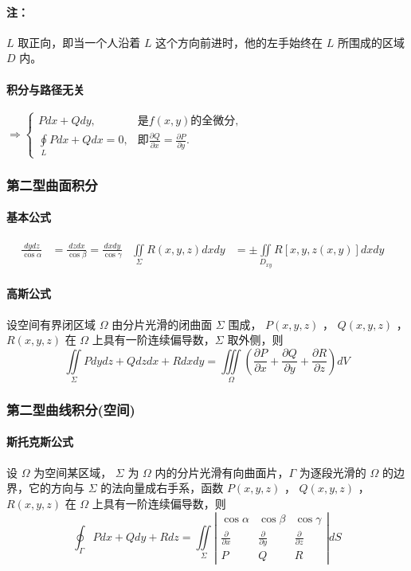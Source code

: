 ﻿\documentclass[a4paper,12pt,UTF8]{ctexart}
\begin{document}
    \paragraph{注：} \(L\) 取正向，即当一个人沿着 \(L\) 这个方向前进时，他的左手始终在 \(L\) 所围成的区域 \(D\) 内。
    
    \paragraph{积分与路径无关}
    \(\Rightarrow \begin{cases}
        Pdx+Qdy,& \text{是} f(x, y) \text{的全微分},\\
        \oint \limits_{L} Pdx+Qdx = 0,& \text{即} \frac{\partial Q}{\partial x} = \frac{\partial P}{\partial y}.
    \end{cases}\)

    \subsubsection{第二型曲面积分}
    \paragraph{基本公式}
    \begin{align*}
        \frac{dydz}{\cos \alpha}&=\frac{dzdx}{\cos \beta}=\frac{dxdy}{\cos \gamma}& \iint \limits_{\Sigma} R(x,y,z)dxdy&=\pm \iint \limits_{D_{xy}} R[x,y,z(x,y)]dxdy&
    \end{align*}

    \paragraph{高斯公式} 设空间有界闭区域 \(\Omega\) 由分片光滑的闭曲面 \(\Sigma \) 围成， \(P(x, y, z)\) ， \(Q(x, y, z)\) ， \(R(x, y, z)\) 在 \(\Omega\) 上具有一阶连续偏导数，\(\Sigma\) 取外侧，则
    \[\iint \limits_{\Sigma} Pdydz+Qdzdx+Rdxdy=\iiint \limits_{\Omega} \left( \frac{\partial P}{\partial x} + \frac{\partial Q}{\partial y} + \frac{\partial R}{\partial z} \right)dV^{}\]

    \subsubsection{第二型曲线积分(空间)}
    \paragraph{斯托克斯公式} 设 \(\Omega\) 为空间某区域， \(\Sigma \) 为 \(\Omega \) 内的分片光滑有向曲面片，\(\Gamma \) 为逐段光滑的 \(\Omega \) 的边界，它的方向与 \(\Sigma \) 的法向量成右手系，函数 \(P(x, y, z)\) ， \(Q(x, y, z)\) ， \(R(x, y, z)\) 在 \(\Omega\) 上具有一阶连续偏导数，则
    \[\oint_{\Gamma }Pdx+Qdy+Rdz = \iint \limits_{\Sigma }\left|\begin{array}{cccc}
        \cos \alpha & \cos \beta & \cos \gamma \\
        \frac{\partial}{\partial x}& \frac{\partial}{\partial y}& \frac{\partial}{\partial z}\\
        P& Q& R
    \end{array}\right|dS\]
\end{document}
